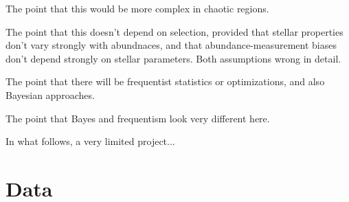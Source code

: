 \documentclass[modern]{aastex63}
\newcommand{\galah}{\acronym{GALAH}}
\newcommand{\hermes}{\acronym{HERMES}}
\begin{document}
The point that this would be more complex in chaotic regions.

The point that this doesn't depend on selection, provided that stellar properties don't vary
strongly with abundnaces, and that abundance-measurement biases don't depend strongly on stellar
parameters. Both assumptions wrong in detail.

The point that there will be frequentist statistics or optimizations, and also Bayesian
approaches.

The point that Bayes and frequentism look very different here.

In what follows, a very limited project...

\section{Data}



\end{document}
